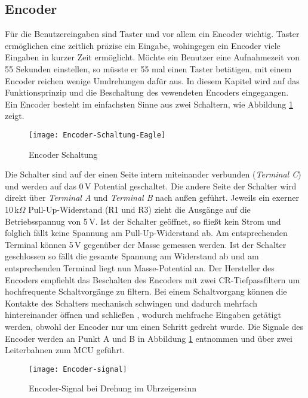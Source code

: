 
\subsection{Encoder}
\label{sec:Encoder}
Für die Benutzereingaben sind Taster und vor allem ein Encoder wichtig. Taster ermöglichen eine zeitlich präzise ein Eingabe, wohingegen ein Encoder viele Eingaben in kurzer Zeit ermöglicht. Möchte ein Benutzer eine Aufnahmezeit von 55 Sekunden einstellen, so müsste er 55 mal einen Taster betätigen, mit einem Encoder reichen wenige Umdrehungen dafür aus. In diesem Kapitel wird auf das Funktionsprinzip und die Beschaltung des vewendeten Encoders eingegangen.\\
Ein Encoder besteht im einfachsten Sinne aus zwei Schaltern, wie Abbildung \ref{fig:Encoder-Schaltung} zeigt. 
\begin{figure}[h]
	\begin{center}
		\texttt{[image: Encoder-Schaltung-Eagle]}
		\caption{Encoder Schaltung \cite{EncoderMN}}
		\label{fig:Encoder-Schaltung}
	\end{center}
\end{figure}
Die Schalter sind auf der einen Seite intern miteinander verbunden (\textit{Terminal C}) und werden auf das 0\,V Potential geschaltet. Die andere Seite der Schalter wird direkt über \textit{Terminal A} und \textit{Terminal B} nach außen geführt. Jeweils ein exerner 10\,k$\Omega$ Pull-Up-Widerstand (R1 und R3) zieht die Ausgänge auf die Betriebsspannug von 5\,V. Ist der Schalter geöffnet, so fließt kein Strom und folglich fällt keine Spannung am Pull-Up-Widerstand ab. Am entsprechenden Terminal können 5\,V gegenüber der Masse gemessen werden. Ist der Schalter geschlossen so fällt die gesamte Spannung am Widerstand ab und am entsprechenden Terminal liegt nun Masse-Potential an. Der Hersteller des Encoders empfiehlt das Beschalten des Encoders mit zwei CR-Tiefpassfiltern um hochfrequente Schaltvorgänge zu filtern. Bei einem Schaltvorgang können die Kontakte des Schalters mechanisch schwingen und dadurch mehrfach hintereinander öffnen und schließen \cite[s. 67]{TechInfo}, wodurch mehfrache Eingaben getätigt werden, obwohl der Encoder nur um einen Schritt gedreht wurde. Die Signale des Encoder werden an Punkt A und B in Abbildung \ref{fig:Encoder-Schaltung} entnommen und über zwei Leiterbahnen zum MCU geführt. %
\begin{figure}[h]
	\texttt{[image: Encoder-signal]}
	\caption{Encoder-Signal bei Drehung im Uhrzeigersinn}
	\label{fig:Encoder-signal}
\end{figure}

